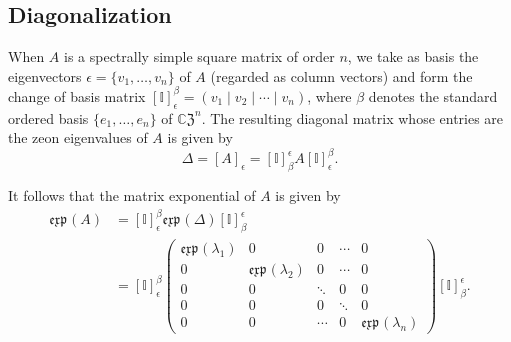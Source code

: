 \documentclass{article}
\theoremstyle{definition}
\newcommand{\zexp}{\mathfrak{exp}\mspace{1mu}}
\newcommand{\CZ}{\mathbb{C}\mathfrak{Z}}
\newcommand{\mI}{\mathbb{I}}
\numberwithin{equation}{section}
\begin{document}
\subsection{Diagonalization}

When $A$ is a spectrally simple square matrix of order $n$, we take as basis the eigenvectors $\epsilon=\{v_1, \ldots, v_n\}$ of $A$ (regarded as column vectors) and form the change of basis matrix $[\mI]_\epsilon^\beta=\left(v_1\mid v_2\mid \cdots\mid v_n\right)$, where $\beta$ denotes the standard ordered basis $\{e_1, \ldots, e_n\}$ of $\CZ^n$.  The resulting diagonal matrix whose entries are the zeon eigenvalues of $A$ is given by \begin{equation}\label{matrix diagonalization}
\Delta=[A]_\epsilon= [\mI]_\beta^\epsilon A[\mI]_\epsilon^\beta.
\end{equation}

It follows that the matrix exponential of $A$ is given by \begin{align}\label{diagonal exp}
\zexp(A)&=[\mI]_\epsilon^\beta\zexp(\Delta) [\mI]_\beta^\epsilon\nonumber\\
&=[\mI]_\epsilon^\beta\begin{pmatrix}
\zexp(\lambda_1)& 0&0&\cdots&0\\
0&\zexp(\lambda_2)&0&\cdots&0\\
0&0&\ddots&0 &0\\
0&0&0&\ddots&0\\
0&0&\cdots&0&\zexp(\lambda_n)
\end{pmatrix} [\mI]_\beta^\epsilon.
\end{align}
\end{document}
